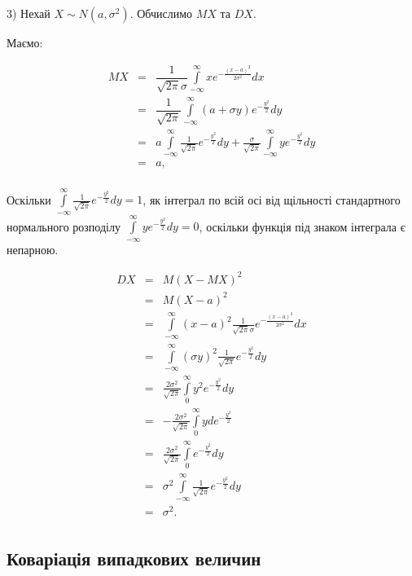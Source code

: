 3) Нехай $X \sim N(a, \sigma^2)$. Обчислимо $MX$ та $DX$.

Маємо:

$$\begin{array}{rcl}
    MX & = & \dfrac{1}{\sqrt{2 \pi} \sigma} \int\limits_{-\infty}^{\infty} x e^{-\frac{(x-a)^2}{2\sigma^2}} dx\\
    & = & \dfrac{1}{\sqrt{2 \pi}} \int\limits_{-\infty}^{\infty} (a + \sigma y)e^{-\frac{y^2}{2}} dy\\
    & = & a \int\limits_{-\infty}^{\infty} \frac{1}{\sqrt{2\pi}} e^{-\frac{y^2}{2}} dy
        + \frac{\sigma}{\sqrt{2\pi}} \int\limits_{-\infty}^{\infty} y e^{-\frac{y^2}{2}} dy\\
    & = & a, \\
\end{array}$$

Оскільки $\int\limits_{-\infty}^{\infty} \frac{1}{\sqrt{2\pi}} e^{-\frac{y^2}{2}} dy = 1$,
як інтеграл по всій осі від 
щільності стандартного нормального розподілу
$\int\limits_{-\infty}^{\infty} y e^{-\frac{y^2}{2}} dy = 0$,
оскільки функція під знаком інтеграла є непарною.

$$\begin{array}{rcl}
    DX & = & M(X-MX)^2 \\
    & = & M(X-a)^2 \\
    & = & \int\limits_{-\infty}^{\infty} (x-a)^2 \frac{1}{\sqrt{2\pi} \sigma} e^{-\frac{(x-a)^2}{2\sigma^2}} dx \\
    & = & \int\limits_{-\infty}^{\infty} (\sigma y)^2 \frac{1}{\sqrt{2\pi}} e^{-\frac{y^2}{2}} dy \\
    & = & \frac{2 \sigma^2}{\sqrt{2\pi}} \int\limits_{0}^{\infty} y^2 e^{-\frac{y^2}{2}} dy \\
    & = & -\frac{2 \sigma^2}{\sqrt{2\pi}} \int\limits_{0}^{\infty} y de^{-\frac{y^2}{2}} \\
    & = & \frac{2 \sigma^2}{\sqrt{2\pi}} \int\limits_{0}^{\infty} e^{-\frac{y^2}{2}} dy \\
    & = & \sigma^2 \int\limits_{-\infty}^{\infty} \frac{1}{\sqrt{2\pi}} e^{-\frac{y^2}{2}} dy \\
    & = & \sigma^2. \\
\end{array}$$


\subsection{Коваріація випадкових величин}

